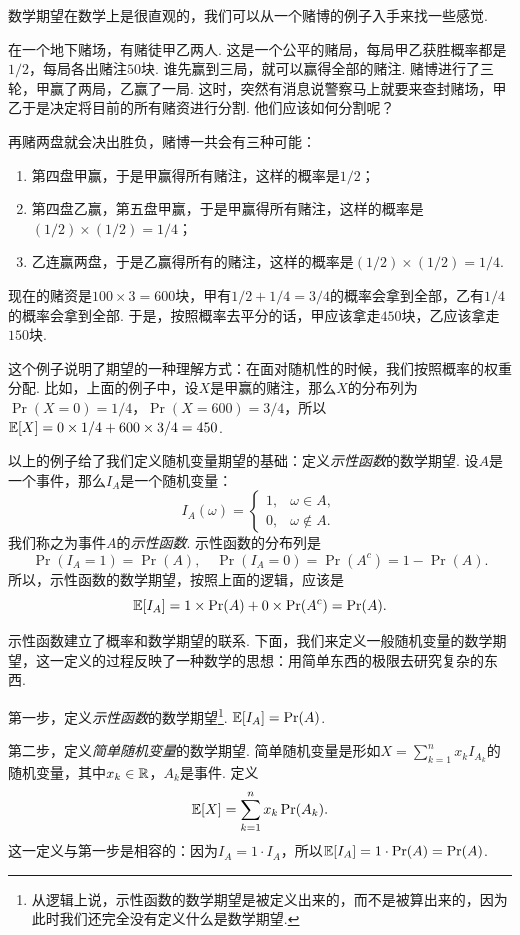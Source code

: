 数学期望在数学上是很直观的，我们可以从一个赌博的例子入手来找一些感觉. 

\begin{example}
在一个地下赌场，有赌徒甲乙两人. 这是一个公平的赌局，每局甲乙获胜概率都是$1/2$，每局各出赌注$50$块. 谁先赢到三局，就可以赢得全部的赌注. 赌博进行了三轮，甲赢了两局，乙赢了一局. 这时，突然有消息说警察马上就要来查封赌场，甲乙于是决定将目前的所有赌资进行分割. 他们应该如何分割呢？

再赌两盘就会决出胜负，赌博一共会有三种可能：
\begin{enumerate}
    \item 第四盘甲赢，于是甲赢得所有赌注，这样的概率是$1/2$；
    \item 第四盘乙赢，第五盘甲赢，于是甲赢得所有赌注，这样的概率是$(1/2)\times(1/2)=1/4$；
    \item 乙连赢两盘，于是乙赢得所有的赌注，这样的概率是$(1/2)\times(1/2)=1/4$. 
\end{enumerate}
现在的赌资是$100\times 3=600$块，甲有$1/2+1/4=3/4$的概率会拿到全部，乙有$1/4$的概率会拿到全部. 于是，按照概率去平分的话，甲应该拿走$450$块，乙应该拿走$150$块. 
\end{example}

这个例子说明了期望的一种理解方式：在面对随机性的时候，我们按照概率的权重分配. 比如，上面的例子中，设$X$是甲赢的赌注，那么$X$的分布列为$\Pr(X=0)=1/4$，$\Pr(X=600)=3/4$，所以$\mathbb{E}[X]=0\times 1/4+600\times 3/4=450$.

以上的例子给了我们定义随机变量期望的基础：定义\textit{示性函数}的数学期望. 设$A$是一个事件，那么$I_A$是一个随机变量：
\[I_A(\omega)=\begin{cases}
    1,&\omega\in A,\\
    0,&\omega\notin A.
\end{cases}\]
我们称之为事件$A$的\textit{示性函数}. 示性函数的分布列是
\[\Pr(I_A=1)=\Pr(A),\quad \Pr(I_A=0)=\Pr(A^c)=1-\Pr(A).\]
所以，示性函数的数学期望，按照上面的逻辑，应该是
\[\mathbb{E}[I_A]=1\times\Pr(A)+0\times\Pr(A^c)=\Pr(A).\]

示性函数建立了概率和数学期望的联系. 下面，我们来定义一般随机变量的数学期望，这一定义的过程反映了一种数学的思想：用简单东西的极限去研究复杂的东西. 

第一步，定义\textit{示性函数}的数学期望\footnote{从逻辑上说，示性函数的数学期望是被定义出来的，而不是被算出来的，因为此时我们还完全没有定义什么是数学期望. }. $\mathbb{E}[I_A]=\Pr(A)$.

第二步，定义\textit{简单随机变量}的数学期望. 简单随机变量是形如$X=\sum_{k=1}^n x_kI_{A_k}$的随机变量，其中$x_k\in\mathbb{R}$，$A_k$是事件. 定义
\[\mathbb{E}[X]=\sum_{k=1}^n x_k\Pr(A_k).\]
这一定义与第一步是相容的：因为$I_A=1\cdot I_{A}$，所以$\mathbb{E}[I_A]=1\cdot\Pr(A)=\Pr(A)$. 

